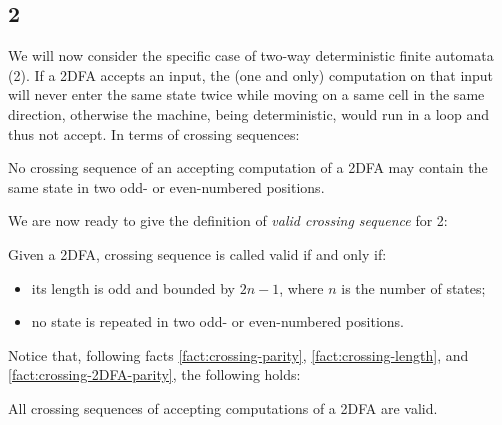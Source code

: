 \subsection{2\DFAs{}}
We will now consider the specific case of two-way deterministic finite automata (2\DFAs{}).
If a 2DFA accepts an input, the (one and only) computation on that input will never enter the same state twice while moving on a same cell in the same direction, otherwise the machine, being deterministic, would run in a loop and thus not accept.
In terms of crossing sequences:
\begin{fact}\label{fact:crossing-2DFA-parity}
	No crossing sequence of an accepting computation of a 2DFA may contain the same state in two odd- or even-numbered positions.
\end{fact}

We are now ready to give the definition of \emph{valid crossing sequence} for 2\DFAs{}:
\begin{defn}
	Given a 2DFA, crossing sequence is called valid if and only if:
	\begin{itemize}
		\item its length is odd and bounded by $2n-1$, where $n$ is the number of states;
		\item no state is repeated in two odd- or even-numbered positions.
	\end{itemize}
\end{defn}

Notice that, following facts \ref{fact:crossing-parity}, \ref{fact:crossing-length}, and \ref{fact:crossing-2DFA-parity}, the following holds:
\begin{fact}
	All crossing sequences of accepting computations of a 2DFA are valid.
\end{fact}

